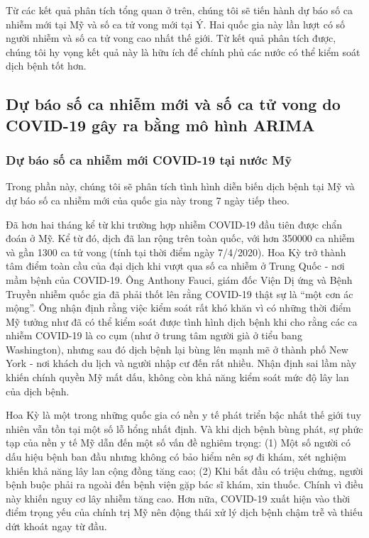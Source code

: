 \documentclass[12pt, a4paper,oneside]{book}
\theoremstyle{definition}
\begin{document}
Từ các kết quả phân tích tổng quan ở trên, chúng tôi sẽ tiến hành dự báo số ca nhiễm mới tại Mỹ và số ca tử vong mới tại Ý. Hai quốc gia này lần lượt có số người nhiễm và số ca tử vong cao nhất thế giới. Từ kết quả phân tích được, chúng tôi hy vọng kết quả này là hữu ích để chính phủ các nước có thể kiểm soát dịch bệnh tốt hơn.
\subsection{Dự báo số ca nhiễm mới và số ca tử vong do COVID-19 gây ra bằng mô hình ARIMA}
\subsubsection{Dự báo số ca nhiễm mới COVID-19 tại nước Mỹ}
Trong phần này, chúng tôi sẽ phân tích tình hình diễn biến dịch bệnh tại Mỹ và dự báo số ca nhiễm mới của quốc gia này trong 7 ngày tiếp theo.

Đã hơn hai tháng kể từ khi trường hợp nhiễm COVID-19 đầu tiên được chẩn đoán ở Mỹ. Kể từ đó, dịch đã lan rộng trên toàn quốc, với hơn 350000 ca nhiễm và gần 1300 ca tử vong (tính tại thời điểm ngày 7/4/2020). Hoa Kỳ trở thành tâm điểm toàn cầu của đại dịch khi vượt qua số ca nhiễm ở Trung Quốc - nơi mầm bệnh của COVID-19. Ông Anthony Fauci, giám đốc Viện Dị ứng và Bệnh Truyền nhiễm quốc gia đã phải thốt lên rằng COVID-19 thật sự là “một cơn ác mộng”. Ông nhận định rằng việc kiểm soát rất khó khăn vì có những thời điểm Mỹ tưởng như đã có thể kiểm soát được tình hình dịch bệnh khi cho rằng các ca nhiễm COVID-19 là co cụm (như ở trung tâm người già ở tiểu bang Washington), nhưng sau đó dịch bệnh lại bùng lên mạnh mẽ ở thành phố New York - nơi khách du lịch và người nhập cư đến rất nhiều. Nhận định sai lầm này khiến chính quyền Mỹ mất dấu, không còn khả năng kiểm soát mức độ lây lan của dịch bệnh.

Hoa Kỳ là một trong những quốc gia có nền y tế phát triển bậc nhất thế giới tuy nhiên vẫn tồn tại một số lỗ hổng nhất định. Và khi dịch bệnh bùng phát, sự phức tạp của nền y tế Mỹ dẫn đến một số vấn đề nghiêm trọng: (1) Một số người có dấu hiệu bệnh ban đầu nhưng không có bảo hiểm nên sợ đi khám, xét nghiệm khiến khả năng lây lan cộng đồng tăng cao; (2) Khi bắt đầu có triệu chứng, người bệnh buộc phải ra ngoài đến bệnh viện gặp bác sĩ khám, xin thuốc. Chính vì điều này khiến nguy cơ lây nhiễm tăng cao. Hơn nữa, COVID-19 xuất hiện vào thời điểm trọng yếu của chính trị Mỹ nên động thái xử lý dịch bệnh chậm trễ và thiếu dứt khoát ngay từ đầu.
\end{document}
